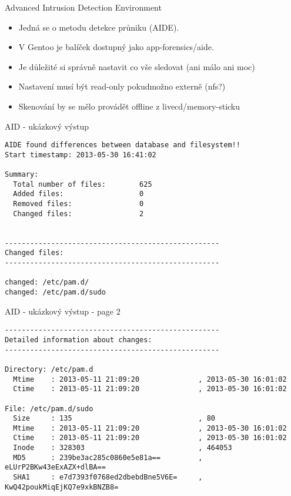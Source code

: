 \documentclass{beamer}
\begin{document}
\begin{frame}{Advanced Intrusion Detection Environment}
	\begin{itemize}
		\item Jedná se o metodu detekce průniku (AIDE).
		\item V Gentoo je balíček dostupný jako app-forensics/aide.
		\item Je důležité si správně nastavit co vše sledovat (ani málo ani moc)
		\item Nastavení musí být read-only pokudmožno externě (nfs?)
		\item Skenování by se mělo provádět offline z livecd/memory-sticku
	\end{itemize}
\end{frame}

\begin{frame}[fragile]{AID - ukázkový výstup}
	\begin{tiny}
	\begin{verbatim}
AIDE found differences between database and filesystem!!
Start timestamp: 2013-05-30 16:41:02

Summary:
  Total number of files:        625
  Added files:                  0
  Removed files:                0
  Changed files:                2


---------------------------------------------------
Changed files:
---------------------------------------------------

changed: /etc/pam.d/
changed: /etc/pam.d/sudo
	\end{verbatim}
	\end{tiny}
\end{frame}


\begin{frame}[fragile]{AID - ukázkový výstup - page 2}
	\begin{tiny}
	\begin{verbatim}
---------------------------------------------------
Detailed information about changes:
---------------------------------------------------

Directory: /etc/pam.d
  Mtime    : 2013-05-11 21:09:20              , 2013-05-30 16:01:02
  Ctime    : 2013-05-11 21:09:20              , 2013-05-30 16:01:02

File: /etc/pam.d/sudo
  Size     : 135                              , 80
  Mtime    : 2013-05-11 21:09:20              , 2013-05-30 16:01:02
  Ctime    : 2013-05-11 21:09:20              , 2013-05-30 16:01:02
  Inode    : 328303                           , 464053
  MD5      : 239be3ac285c0860e5e81a==         , eLUrP2BKw43eExAZX+dlBA==
  SHA1     : e7d7393f0768ed2dbebdBne5V6E=     , KwQ42poukMiqEjKQ7e9xkBNZB8=
	\end{verbatim}
	\end{tiny}
\end{frame}
\end{document}
